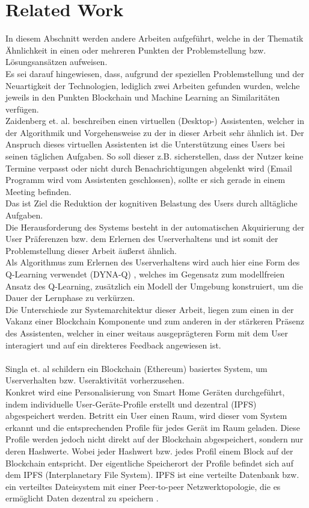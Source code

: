 \section{Related Work}
In diesem Abschnitt werden andere Arbeiten aufgeführt, welche in der Thematik Ähnlichkeit in einen oder mehreren Punkten der Problemstellung bzw. Lösungsansätzen aufweisen. \\
Es sei darauf hingewiesen, dass, aufgrund der speziellen Problemstellung und der Neuartigkeit der Technologien, lediglich zwei Arbeiten gefunden wurden, welche jeweils in den Punkten Blockchain und Machine Learning an Similaritäten verfügen. \\
Zaidenberg et. al. \cite{zaidenberg:hal-00788028} beschreiben einen virtuellen (Desktop-) Assistenten, welcher in der Al­go­rith­mik und Vorgehensweise zu der in dieser Arbeit sehr ähnlich ist. Der Anspruch dieses virtuellen Assistenten ist die Unterstützung eines Users bei seinen täglichen Aufgaben. So soll dieser z.B. sicherstellen, dass der Nutzer keine Termine verpasst oder  nicht durch Benachrichtigungen abgelenkt wird (Email Programm wird vom Assistenten geschlossen), sollte er sich gerade in einem Meeting befinden. \\
Das ist Ziel die Reduktion der kognitiven Belastung des Users durch alltägliche Aufgaben. \\
Die Herausforderung des Systems besteht in der automatischen Ak­qui­rie­rung der User Präferenzen bzw. dem Erlernen des Userverhaltens und ist somit der Problemstellung dieser Arbeit äußerst ähnlich.\\
Als Algorithmus zum Erlernen des Userverhaltens wird auch hier eine Form des Q-Learning verwendet (DYNA-Q) \cite{Sutton}, welches im Gegensatz zum modellfreien Ansatz des Q-Learning, zusätzlich ein Modell der Umgebung konstruiert, um die Dauer der Lernphase zu verkürzen.\\
Die Unterschiede zur Systemarchitektur dieser Arbeit, liegen zum einen in der Vakanz einer Blockchain Komponente und zum anderen in der stärkeren Präsenz des Assistenten, welcher in einer weitaus ausgeprägteren Form mit dem User interagiert und auf ein direkteres Feedback angewiesen ist. \\\\
Singla et. al \cite{Singla:MLSDPUB} schildern ein Blockchain (Ethereum) basiertes System, um Userverhalten bzw. Useraktivität vorherzusehen.\\
Konkret wird eine Personalisierung von Smart Home Geräten durchgeführt, indem individuelle User-Geräte-Profile erstellt und dezentral (IPFS) abgespeichert werden. Betritt ein User einen Raum, wird dieser vom System erkannt und die entsprechenden Profile für jedes Gerät im Raum geladen. Diese Profile werden jedoch nicht direkt auf der Blockchain abgespeichert, sondern nur deren Hashwerte. Wobei jeder Hashwert bzw. jedes Profil einem Block auf der Blockchain entspricht. Der eigentliche Speicherort der Profile befindet sich auf dem IPFS (Interplanetary File System). IPFS ist eine verteilte Datenbank bzw. ein verteiltes Dateisystem mit einer Peer-to-peer Netzwerktopologie, die es ermöglicht Daten dezentral zu speichern \cite{IPFSIO, IPFSWP}.\\
